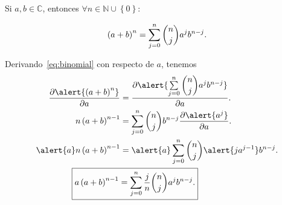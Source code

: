 \begin{frame}
    \begin{theorem}
        Si $a,b\in\mathbb{C}$, entonces
        \begin{math}
            \forall n\in\mathbb{N}\cup\left\{0\right\}:
        \end{math}

        \begin{equation}\label{eq:binomial}
            \left(a+b\right)^{n}=
            \sum\limits_{j=0}^{n}
            \dbinom{n}{j}
            a^{j}
            b^{n-j}.
        \end{equation}
    \end{theorem}

    Derivando~\eqref{eq:binomial} con respecto de $a$, tenemos
    \begin{align}
        \diffp{
            \alert{
                \left(a+b\right)^{n}
            }
        }{a}                    & =
        \diffp{
            \alert{
                \sum\limits_{j=0}^{n}
                \dbinom{n}{j}
                a^{j}
                b^{n-j}
            }
        }{a}.  \notag               \\
        n\left(a+b\right)^{n-1} & =
        \sum\limits_{j=0}^{n}
        \dbinom{n}{j}
        b^{n-j}
        \diffp{
            \alert{
                a^{j}
            }
        }{a}.   \notag              \\
        \alert{a}
        n\left(a+b\right)^{n-1}
                                & =
        \alert{a}
        \sum\limits_{j=0}^{n}
        \dbinom{n}{j}
        \alert{ja^{j-1}}
        b^{n-j}.      \notag        \\
        \label{eq:binomial_I}
        \Aboxed{
            a\left(a+b\right)^{n-1}
                                & =
            \sum\limits_{j=0}^{n}
            \dfrac{j}{n}
            \dbinom{n}{j}
            a^{j}
            b^{n-j}.
        }
    \end{align}
\end{frame}

